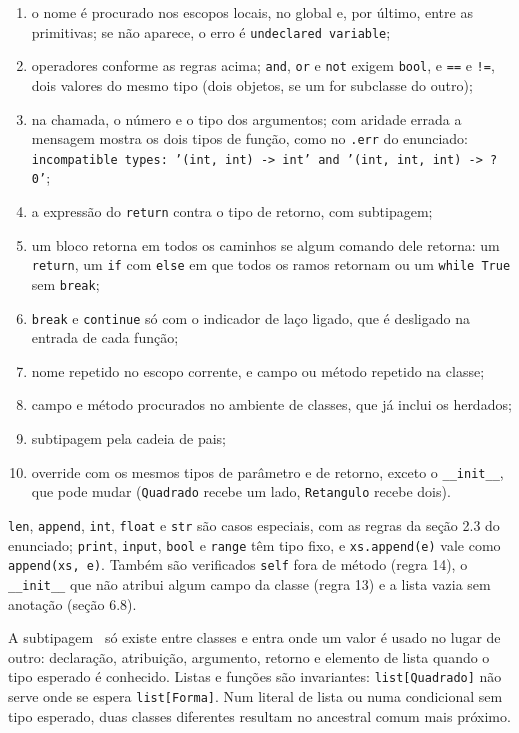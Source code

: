 \documentclass[12pt,a4paper]{article}
\begin{document}
\begin{enumerate}\setlength{\itemsep}{0pt}
\item o nome é procurado nos escopos locais, no global e, por último,
  entre as primitivas; se não aparece, o erro é \texttt{undeclared
  variable};
\item operadores conforme as regras acima; \texttt{and}, \texttt{or} e
  \texttt{not} exigem \texttt{bool}, e \texttt{==} e \texttt{!=}, dois
  valores do mesmo tipo (dois objetos, se um for subclasse do outro);
\item na chamada, o número e o tipo dos argumentos; com aridade errada a
  mensagem mostra os dois tipos de função, como no \texttt{.err} do
  enunciado: \texttt{incompatible types: '(int, int) -> int' and
  '(int, int, int) -> ?0'};
\item a expressão do \texttt{return} contra o tipo de retorno, com
  subtipagem;
\item um bloco retorna em todos os caminhos se algum comando dele
  retorna: um \texttt{return}, um \texttt{if} com \texttt{else} em que
  todos os ramos retornam ou um \texttt{while True} sem \texttt{break};
\item \texttt{break} e \texttt{continue} só com o indicador de laço
  ligado, que é desligado na entrada de cada função;
\item nome repetido no escopo corrente, e campo ou método repetido na
  classe;
\item campo e método procurados no ambiente de classes, que já inclui
  os herdados;
\item subtipagem pela cadeia de pais;
\item override com os mesmos tipos de parâmetro e de retorno, exceto o
  \texttt{\_\_init\_\_}, que pode mudar (\texttt{Quadrado} recebe um
  lado, \texttt{Retangulo} recebe dois).
\end{enumerate}

\texttt{len}, \texttt{append}, \texttt{int}, \texttt{float} e
\texttt{str} são casos especiais, com as regras da seção 2.3 do
enunciado; \texttt{print}, \texttt{input}, \texttt{bool} e
\texttt{range} têm tipo fixo, e \texttt{xs.append(e)} vale como
\texttt{append(xs, e)}. Também são verificados \texttt{self} fora de
método (regra 14), o \texttt{\_\_init\_\_} que não atribui algum campo
da classe (regra 13) e a lista vazia sem anotação (seção 6.8).

A subtipagem~\cite{pierce2002} só existe entre classes e entra onde um
valor é usado no lugar de outro: declaração, atribuição, argumento, retorno e elemento de
lista quando o tipo esperado é conhecido. Listas e funções são
invariantes: \texttt{list[Quadrado]} não serve onde se espera
\texttt{list[Forma]}. Num literal de lista ou numa condicional sem tipo
esperado, duas classes diferentes resultam no ancestral comum mais
próximo.
\end{document}
